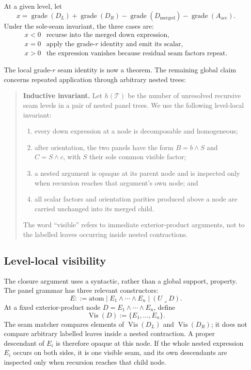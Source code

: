 \documentclass[11pt]{article}
\begin{document}
At a given level, let
\[
x=
\operatorname{grade}(D_L)
+\operatorname{grade}(D_R)
-\operatorname{grade}(D_{\mathrm{merged}})
-\operatorname{grade}(A_{\mathrm{acc}}).
\]
Under the sole-seam invariant, the three cases are:
\[
\begin{array}{c|l}
x<0 & \text{recurse into the merged down expression},\\
x=0 & \text{apply the grade-\(r\) identity and emit its scalar},\\
x>0 & \text{the expression vanishes because residual seam factors repeat}.
\end{array}
\]

The local grade-\(r\) seam identity is now a theorem. The remaining global
claim concerns repeated application through arbitrary nested trees:

\begin{quote}
\textbf{Inductive invariant.}
Let \(h(\mathcal T)\) be the number of unresolved recursive seam levels in a
pair of nested panel trees. We use the following level-local invariant:
\begin{enumerate}
  \item every down expression at a node is decomposable and homogeneous;
  \item after orientation, the two panels have the form
        \(B=b\wedge S\) and \(C=S\wedge c\), with \(S\) their sole common
        visible factor;
  \item a nested argument is opaque at its parent node and is inspected only
        when recursion reaches that argument's own node; and
  \item all scalar factors and orientation parities produced above a node are
        carried unchanged into its merged child.
\end{enumerate}
The word ``visible'' refers to immediate exterior-product arguments, not to
the labelled leaves occurring inside nested contractions.
\end{quote}

\subsection{Level-local visibility}

The closure argument uses a syntactic, rather than a global support,
property. The panel grammar has three relevant constructors:
\[
E ::= \text{atom}\mid E_1\wedge\cdots\wedge E_n
       \mid (U\mathbin{\lrcorner}D).
\]
At a fixed exterior-product node \(D=E_1\wedge\cdots\wedge E_n\), define
\[
\operatorname{Vis}(D):=\{E_1,\ldots,E_n\}.
\]
The seam matcher compares elements of \(\operatorname{Vis}(D_L)\) and
\(\operatorname{Vis}(D_R)\); it does not compare arbitrary labelled leaves
inside a nested contraction. A proper descendant of \(E_i\) is therefore
opaque at this node. If the whole nested expression \(E_i\) occurs on both
sides, it is one visible seam, and its own descendants are inspected only
when recursion reaches that child node.
\end{document}
